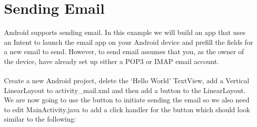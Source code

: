 \section{Sending Email}
\paragraph{} Android supports sending email. In this example we will build an app that uses an Intent to launch the email app on your Android device and prefill the fields for a new email to send. However, to send email assumes that you, as the owner of the device, have already set up either a POP3 or IMAP email account.

\paragraph{} Create a new Android project, delete the `Hello World' TextView, add a Vertical LinearLayout to activity\_mail.xml and then add a button to the LinearLayout. We are now going to use the button to initiate sending the email so we also need to edit MainActivity.java to add a click handler for the button which should look similar to the following:

